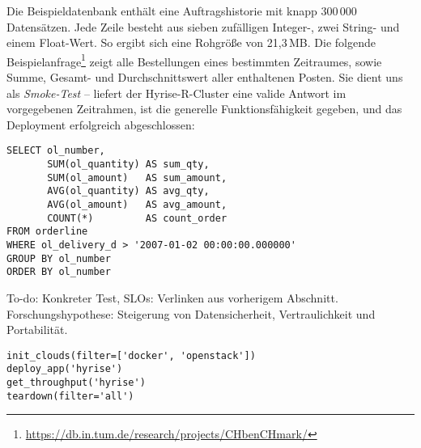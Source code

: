 Die Beispieldatenbank enthält eine Auftragshistorie mit knapp 300\,000 Datensätzen. Jede Zeile besteht aus sieben zufälligen Integer-, zwei String- und einem Float-Wert. So ergibt sich eine Rohgröße von 21,3\,MB. Die folgende Beispielanfrage\footnote{\url{https://db.in.tum.de/research/projects/CHbenCHmark/}} zeigt alle Bestellungen eines bestimmten Zeitraumes, sowie Summe, Gesamt- und Durchschnittswert aller enthaltenen Posten. Sie dient uns als \emph{Smoke-Test} -- liefert der Hyrise-R-Cluster eine valide Antwort im vorgegebenen Zeitrahmen, ist die generelle Funktionsfähigkeit gegeben, und das Deployment erfolgreich abgeschlossen:

\begin{verbatim}
SELECT ol_number,
       SUM(ol_quantity) AS sum_qty,
       SUM(ol_amount)   AS sum_amount,
       AVG(ol_quantity) AS avg_qty,
       AVG(ol_amount)   AS avg_amount,
       COUNT(*)         AS count_order
FROM orderline 
WHERE ol_delivery_d > '2007-01-02 00:00:00.000000' 
GROUP BY ol_number
ORDER BY ol_number
\end{verbatim}

To-do: Konkreter Test, SLOs: Verlinken aus vorherigem Abschnitt. Forschungshypothese: Steigerung von  Datensicherheit, Vertraulichkeit und Portabilität.

\begin{verbatim}
init_clouds(filter=['docker', 'openstack'])
deploy_app('hyrise')
get_throughput('hyrise')
teardown(filter='all')
\end{verbatim}


